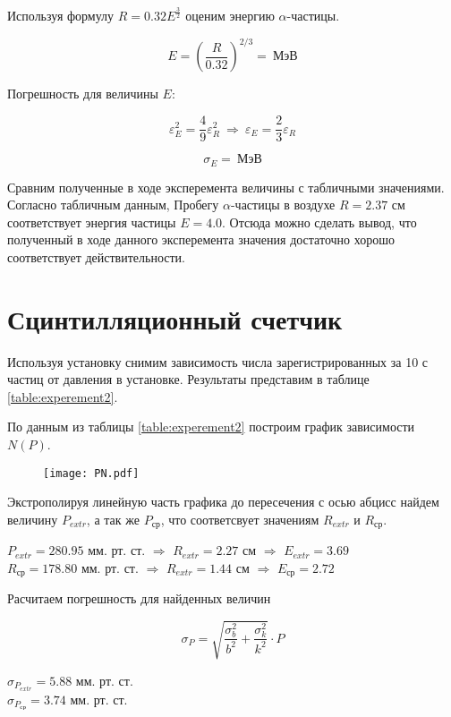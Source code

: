     Используя формулу $R = 0.32 E^{\frac{3}{2}}$ оценим энергию $\alpha$-частицы.

    \[ E = \left(\frac{R}{0.32} \right)^{2/3} = ~ \text{МэВ} \]

    Погрешность для величины $E$:

    \[ \varepsilon_E^2 = \frac{4}{9} \varepsilon_R^2 ~ \Rightarrow ~ \varepsilon_E = \frac{2}{3} \varepsilon_R \]

    \[ \sigma_E =  ~ \text{МэВ} \]

    Сравним полученные в ходе эксперемента величины с табличными значениями. Согласно табличным данным,
    Пробегу $\alpha$-частицы в воздухе $R = 2.37$ см соответствует энергия частицы $E = 4.0$. Отсюда
    можно сделать вывод, что полученный в ходе данного эксперемента значения достаточно хорошо соответствует 
    действительности.

    \section*{Сцинтилляционный счетчик}

    Используя установку снимим зависимость числа зарегистрированных за 10 с частиц от давления в установке.
    Результаты представим в таблице \ref{table:experement2}.

    

    По данным из таблицы \ref{table:experement2} построим график зависимости $N(P)$.

    \begin{figure}
        \centering
        \texttt{[image: PN.pdf]}
        \caption{}
        \label{fig:plot2}
    \end{figure}

    Экстрополируя линейную часть графика до пересечения с осью абцисс найдем величину $P_{extr}$, а так же
    $P_{\text{ср}}$, что соответсвует значениям $R_{extr}$ и $R_{\text{ср}}$.

    \begin{center}
        $P_{extr} = 280.95$ мм. рт. ст. $\Rightarrow$ $R_{extr} = 2.27$ см $\Rightarrow$ $E_{extr} = 3.69$\\
        $R_{\text{ср}} = 178.80$ мм. рт. ст. $\Rightarrow$ $R_{extr} = 1.44$ см $\Rightarrow$ $E_{\text{ср}}  = 2.72$
    \end{center}

    Расчитаем погрешность для найденных величин

    \[ \sigma_P = \sqrt{\frac{\sigma_b^2}{b^2} + \frac{\sigma_k^2}{k^2}} \cdot P \]

    \begin{center}
        $\sigma_{P_{extr}}        = 5.88$ мм. рт. ст. \\
        $\sigma_{P_{\text{ср}}} = 3.74$ мм. рт. ст. \\
    \end{center}
